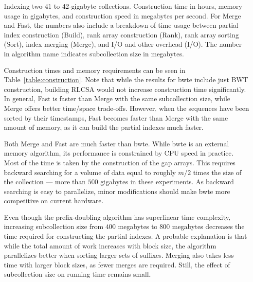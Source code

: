 \begin{table}
\caption{Indexing two $41$ to $42$\nobreakdash-gigabyte collections. Construction time in hours, memory usage in gigabytes, and construction speed in megabytes per second. For Merge and Fast, the numbers also include a breakdown of time usage between partial index construction (Build), rank array construction (Rank), rank array sorting (Sort), index merging (Merge), and I/O and other overhead (I/O). The number in algorithm name indicates subcollection size in megabytes.}\label{table:construction}
\end{table}

Construction times and memory requirements can be seen in Table~\ref{table:construction}. Note that while the results for bwte include just BWT construction, building RLCSA would not increase construction time significantly. In general, Fast is faster than Merge with the same subcollection size, while Merge offers better time/space trade-offs. However, when the sequences have been sorted by their timestamps, Fast becomes faster than Merge with the same amount of memory, as it can build the partial indexes much faster.

\newpage Both Merge and Fast are much faster than bwte. While bwte is an external memory algorithm, its performance is constrained by CPU speed in practice. Most of the time is taken by the construction of the gap arrays. This requires backward searching for a volume of data equal to roughly $m/2$ times the size of the collection --- more than $500$ gigabytes in these experiments. As backward searching is easy to parallelize, minor modifications should make bwte more competitive on current hardware.

Even though the prefix-doubling algorithm has superlinear time complexity, increasing subcollection size from $400$ megabytes to $800$ megabytes decreases the time required for constructing the partial indexes. A probable explanation is that while the total amount of work increases with block size, the algorithm parallelizes better when sorting larger sets of suffixes. Merging also takes less time with larger block sizes, as fewer merges are required. Still, the effect of subcollection size on running time remains small.
